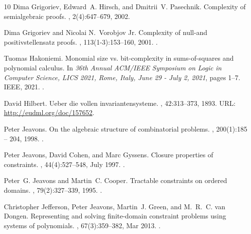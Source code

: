 \documentclass[11pt]{article}
\newcommand{\1}{\textbf{1}}
\begin{document}
\begin{thebibliography}{10}
Dima Grigoriev, Edward~A. Hirsch, and Dmitrii~V. Pasechnik.
\newblock Complexity of semialgebraic proofs.
, 2(4):647--679, 2002.

Dima Grigoriev and Nicolai N.~Vorobjov Jr.
\newblock Complexity of null-and positivstellensatz proofs.
, 113(1-3):153--160, 2001.
\newblock \href {https://doi.org/10.1016/S0168-0072(01)00055-0} {}.

Tuomas Hakoniemi.
\newblock Monomial size vs. bit-complexity in sums-of-squares and polynomial calculus.
\newblock In {\em 36th Annual {ACM/IEEE} Symposium on Logic in Computer Science, {LICS} 2021, Rome, Italy, June 29 - July 2, 2021}, pages 1--7. {IEEE}, 2021.
\newblock \href {https://doi.org/10.1109/LICS52264.2021.9470545} {}.

David Hilbert.
\newblock Ueber die vollen invariantensysteme.
, 42:313--373, 1893.
\newblock URL: \url{http://eudml.org/doc/157652}.

Peter Jeavons.
\newblock On the algebraic structure of combinatorial problems.
, 200(1):185 -- 204, 1998.
\newblock \href {https://doi.org/10.1016/S0304-3975(97)00230-2} {}.

Peter Jeavons, David Cohen, and Marc Gyssens.
\newblock Closure properties of constraints.
, 44(4):527--548, July 1997.
\newblock \href {https://doi.org/10.1145/263867.263489} {}.

Peter~G. Jeavons and Martin~C. Cooper.
\newblock Tractable constraints on ordered domains.
, 79(2):327--339, 1995.
\newblock \href {https://doi.org/10.1016/0004-3702(95)00107-7} {}.

Christopher Jefferson, Peter Jeavons, Martin~J. Green, and M.~R.~C. van Dongen.
\newblock Representing and solving finite-domain constraint problems using systems of polynomials.
, 67(3):359--382, Mar 2013.
\newblock \href {https://doi.org/10.1007/s10472-013-9365-7} {}.


\end{thebibliography}
\end{document}
